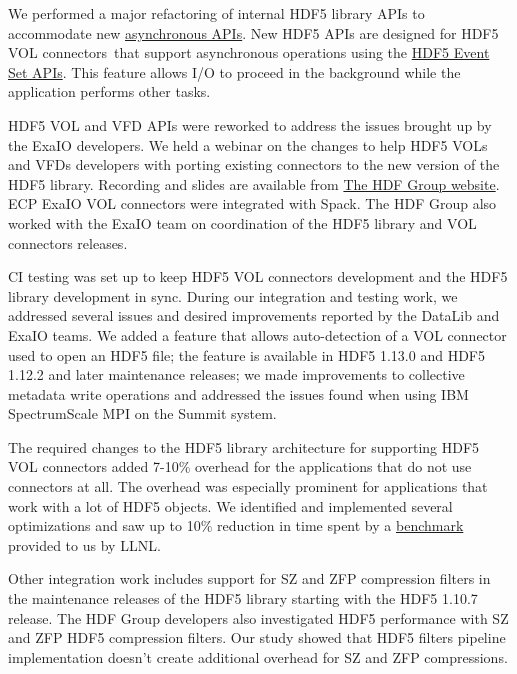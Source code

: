 We performed a major refactoring of internal HDF5 library APIs to accommodate new \href{https://portal.hdfgroup.org/display/HDF5/Asynchronous+operations+with+HDF5+VOL+connectors}{asynchronous APIs}.  New HDF5 APIs are designed for HDF5 VOL connectors that support asynchronous operations using the \href{https://portal.hdfgroup.org/display/HDF5/Event+Set}{HDF5 Event Set APIs}. This feature allows I/O to proceed in the background while the application performs other tasks. 

HDF5 VOL and VFD APIs were reworked to address the issues brought up by the ExaIO developers. We held a webinar on the changes to help HDF5 VOLs and VFDs developers with porting existing connectors to the new version of the HDF5 library. Recording and slides are available from \href{https://www.hdfgroup.org/2021/09/webinar-followup-new-features-in-the-hdf5-1-13-0-release/}{The HDF Group website}. 
ECP ExaIO VOL connectors were integrated with Spack. The HDF Group also worked with the ExaIO team on coordination of the HDF5 library and VOL connectors releases.

CI testing was set up to keep HDF5 VOL connectors development and the HDF5 library development in sync. During our integration and testing work, we addressed several issues and desired improvements reported by the DataLib and ExaIO teams. We added a feature that allows auto-detection of a VOL connector used to open an HDF5 file; the feature is available in HDF5 1.13.0 and HDF5 1.12.2 and later maintenance releases; we made improvements to collective metadata write operations and addressed the issues found when using IBM SpectrumScale MPI on the Summit system.

The required changes to the HDF5 library architecture for supporting HDF5 VOL connectors added 7-10\% overhead for the applications that do not use connectors at all. The overhead was especially prominent for applications that work with a lot of HDF5 objects. We identified and implemented several optimizations and saw up to 10\% reduction in time spent by a \href{https://jira.hdfgroup.org/browse/HDFFV-9671}{benchmark} provided to us by LLNL. 

Other integration work includes support for SZ and ZFP compression filters in the maintenance releases of the HDF5 library starting with the HDF5 1.10.7 release. The HDF Group developers also investigated HDF5 performance with SZ and ZFP HDF5 compression filters. Our study showed that HDF5 filters pipeline implementation doesn't create additional overhead for SZ and ZFP compressions.

